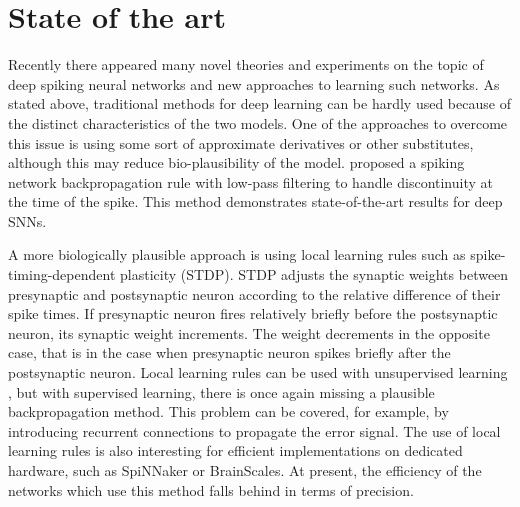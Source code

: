 \section{State of the art}
Recently there appeared many novel theories and experiments on the topic of deep spiking neural networks and new approaches to learning such networks. As stated above, traditional methods for deep learning can be hardly used because of the distinct characteristics of the two models. One of the approaches to overcome this issue is using some sort of approximate derivatives or other substitutes, although this may reduce bio-plausibility of the model. \cite{leeTrainingDeepSpiking2016} proposed a spiking network backpropagation rule with low-pass filtering to handle discontinuity at the time of the spike. This method demonstrates state-of-the-art results for deep SNNs.\par
A more biologically plausible approach is using local learning rules such as spike-timing-dependent plasticity (STDP). STDP adjusts the synaptic weights between presynaptic and postsynaptic neuron according to the relative difference of their spike times. If presynaptic neuron fires relatively briefly before the postsynaptic neuron, its synaptic weight increments. The weight decrements in the opposite case, that is in the case when presynaptic neuron spikes briefly after the postsynaptic neuron. Local learning rules can be used with unsupervised learning \cite{tavanaeiDeepLearningSpiking2019}, but with supervised learning, there is once again missing a plausible backpropagation method. This problem can be covered, for example, by introducing recurrent connections to propagate the error signal. The use of local learning rules is also interesting for efficient implementations on dedicated hardware, such as SpiNNaker\cite{furberSpiNNakerProject14} or BrainScales. At present, the efficiency of the networks which use this method falls behind in terms of precision. \par
